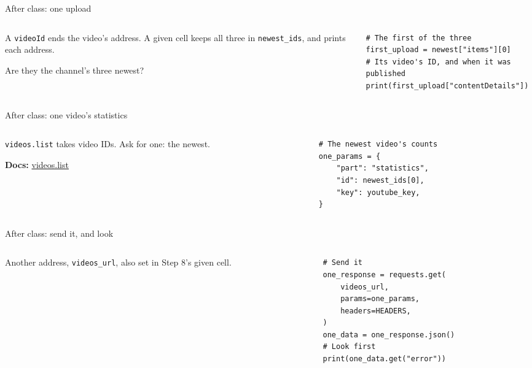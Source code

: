 \documentclass[9pt,aspectratio=169]{beamer}
\begin{document}
\begin{frame}[fragile]{After class: one upload}
    \begin{columns}[T]
        \begin{column}{0.37\textwidth}
            A \texttt{videoId} ends the video's address. A given cell keeps all three in \texttt{newest\_ids}, and prints each address.

            \medskip
            Are they the channel's three newest?
        \end{column}
        \begin{column}{0.6\textwidth}
\begin{lstlisting}
# The first of the three
first_upload = newest["items"][0]
# Its video's ID, and when it was published
print(first_upload["contentDetails"])
\end{lstlisting}
        \end{column}
    \end{columns}
\end{frame}

\begin{frame}[fragile]{After class: one video's statistics}
    \begin{columns}[T]
        \begin{column}{0.37\textwidth}
            \texttt{videos.list} takes video IDs. Ask for one: the newest.

            \medskip
            {\scriptsize\textbf{Docs:} \href{https://developers.google.com/youtube/data/reference/rest/v3/videos/list}{videos.list}\par}
        \end{column}
        \begin{column}{0.6\textwidth}
\begin{lstlisting}
# The newest video's counts
one_params = {
    "part": "statistics",
    "id": newest_ids[0],
    "key": youtube_key,
}
\end{lstlisting}
        \end{column}
    \end{columns}
\end{frame}

\begin{frame}[fragile]{After class: send it, and look}
    \begin{columns}[T]
        \begin{column}{0.37\textwidth}
            Another address, \texttt{videos\_url}, also set in Step 8's given cell.
        \end{column}
        \begin{column}{0.6\textwidth}
\begin{lstlisting}
# Send it
one_response = requests.get(
    videos_url,
    params=one_params,
    headers=HEADERS,
)
one_data = one_response.json()
# Look first
print(one_data.get("error"))
\end{lstlisting}
        \end{column}
    \end{columns}
\end{frame}
\end{document}

